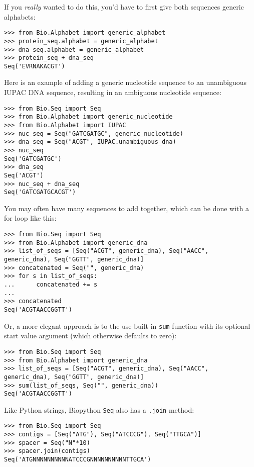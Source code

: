 If you \emph{really} wanted to do this, you'd have to first give both sequences generic alphabets:

\begin{verbatim}
>>> from Bio.Alphabet import generic_alphabet
>>> protein_seq.alphabet = generic_alphabet
>>> dna_seq.alphabet = generic_alphabet
>>> protein_seq + dna_seq
Seq('EVRNAKACGT')
\end{verbatim}

Here is an example of adding a generic nucleotide sequence to an unambiguous IUPAC DNA sequence, resulting in an ambiguous nucleotide sequence:

\begin{verbatim}
>>> from Bio.Seq import Seq
>>> from Bio.Alphabet import generic_nucleotide
>>> from Bio.Alphabet import IUPAC
>>> nuc_seq = Seq("GATCGATGC", generic_nucleotide)
>>> dna_seq = Seq("ACGT", IUPAC.unambiguous_dna)
>>> nuc_seq
Seq('GATCGATGC')
>>> dna_seq
Seq('ACGT')
>>> nuc_seq + dna_seq
Seq('GATCGATGCACGT')
\end{verbatim}

You may often have many sequences to add together, which can be done with a for loop like this:

\begin{verbatim}
>>> from Bio.Seq import Seq
>>> from Bio.Alphabet import generic_dna
>>> list_of_seqs = [Seq("ACGT", generic_dna), Seq("AACC", generic_dna), Seq("GGTT", generic_dna)]
>>> concatenated = Seq("", generic_dna)
>>> for s in list_of_seqs:
...      concatenated += s
...
>>> concatenated
Seq('ACGTAACCGGTT')
\end{verbatim}

Or, a more elegant approach is to the use built in \verb|sum| function with its optional start value argument (which otherwise defaults to zero):

\begin{verbatim}
>>> from Bio.Seq import Seq
>>> from Bio.Alphabet import generic_dna
>>> list_of_seqs = [Seq("ACGT", generic_dna), Seq("AACC", generic_dna), Seq("GGTT", generic_dna)]
>>> sum(list_of_seqs, Seq("", generic_dna))
Seq('ACGTAACCGGTT')
\end{verbatim}

Like Python strings, Biopython \verb|Seq| also has a \verb|.join| method:

\begin{verbatim}
>>> from Bio.Seq import Seq
>>> contigs = [Seq("ATG"), Seq("ATCCCG"), Seq("TTGCA")]
>>> spacer = Seq("N"*10)
>>> spacer.join(contigs)
Seq('ATGNNNNNNNNNNATCCCGNNNNNNNNNNTTGCA')
\end{verbatim}


